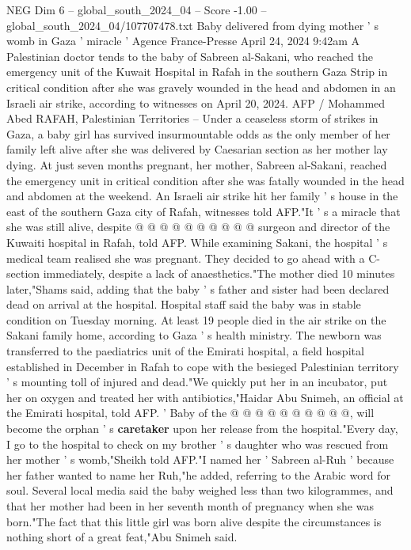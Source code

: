 \begin{textsample}{NEG Dim 6 – global\_south\_2024\_04 – Score -1.00 – global\_south\_2024\_04/107707478.txt}  \label{ex:f6_neg_357}
Baby delivered from dying mother ' s womb in Gaza ' miracle ' Agence France-Presse April 24, 2024 9:42am A Palestinian doctor tends to the baby of Sabreen al-Sakani, who reached the emergency unit of the Kuwait Hospital in Rafah in the southern Gaza Strip in critical condition after she was gravely wounded in the head and abdomen in an Israeli air strike, according to witnesses on April 20, 2024.
AFP / Mohammed Abed RAFAH, Palestinian Territories -- Under a ceaseless storm of strikes in Gaza, a baby girl has survived insurmountable odds as the only member of her family left alive after she was delivered by Caesarian section as her mother lay dying.
At just seven months pregnant, her mother, Sabreen al-Sakani, reached the emergency unit in critical condition after she was fatally wounded in the head and abdomen at the weekend.
An Israeli air strike hit her family ' s house in the east of the southern Gaza city of Rafah, witnesses told AFP."It ' s a miracle that she was still alive, despite @ @ @ @ @ @ @ @ @ @ surgeon and director of the Kuwaiti hospital in Rafah, told AFP.
While examining Sakani, the hospital ' s medical team realised she was pregnant.
They decided to go ahead with a C-section immediately, despite a lack of anaesthetics."The mother died 10 minutes later,"Shams said, adding that the baby ' s father and sister had been declared dead on arrival at the hospital.
Hospital staff said the baby was in stable condition on Tuesday morning.
At least 19 people died in the air strike on the Sakani family home, according to Gaza ' s health ministry.
The newborn was transferred to the paediatrics unit of the Emirati hospital, a field hospital established in December in Rafah to cope with the besieged Palestinian territory ' s mounting toll of injured and dead."We quickly put her in an incubator, put her on oxygen and treated her with antibiotics,"Haidar Abu Snimeh, an official at the Emirati hospital, told AFP. ' Baby of the @ @ @ @ @ @ @ @ @ @, will become the orphan ' s \textbf{caretaker} upon her release from the hospital."Every day, I go to the hospital to check on my brother ' s daughter who was rescued from her mother ' s womb,"Sheikh told AFP."I named her ' Sabreen al-Ruh ' because her father wanted to name her Ruh,"he added, referring to the Arabic word for soul.
Several local media said the baby weighed less than two kilogrammes, and that her mother had been in her seventh month of pregnancy when she was born."The fact that this little girl was born alive despite the circumstances is nothing short of a great feat,"Abu Snimeh said.

\end{textsample}
